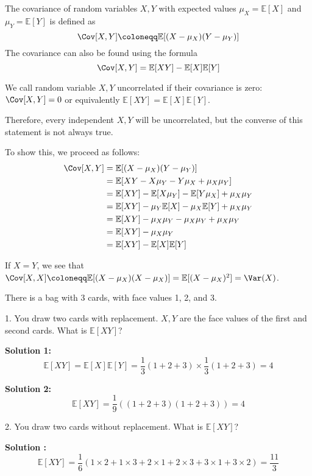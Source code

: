 \begin{definition}[Covariance]
    The covariance of random variables \(X, Y\) with expected values \(\mu_X = \mathbb{E}[X]\) and \(\mu_Y = \mathbb{E}[Y]\) is defined as 
    \[
        \Cov[X, Y] \coloneqq \mathbb{E}[(X - \mu_X)(Y - \mu_Y)]
    \]
    The covariance can also be found using the formula 
    \[
        \Cov[X, Y] = \mathbb{E}[XY] - \mathbb{E}[X]\mathbb{E}[Y]
    \]

    \begin{remark}
        We call random variable \(X, Y\) uncorrelated if their covariance is zero: \(\Cov[X, Y] = 0\) or equivalently \(\mathbb{E}[XY] = \mathbb{E}[X]\mathbb{E}[Y]\). 

        Therefore, every independent \(X, Y\) will be uncorrelated, but the converse of this statement is not always true. 
    \end{remark}
\end{definition}

To show this, we proceed as follows:
\[
    \begin{aligned}
        \Cov[X, Y] &= \mathbb{E}[(X - \mu_X)(Y - \mu_Y)] \\
        &= \mathbb{E}[XY - X\mu_Y - Y\mu_X + \mu_X\mu_Y] \\
        &= \mathbb{E}[XY] - \mathbb{E}[X\mu_Y] - \mathbb{E}[Y\mu_X] + \mu_X\mu_Y \\
        &= \mathbb{E}[XY] - \mu_Y\mathbb{E}[X] - \mu_X\mathbb{E}[Y] + \mu_X\mu_Y \\
        &= \mathbb{E}[XY] - \mu_X\mu_Y - \mu_X\mu_Y + \mu_X\mu_Y \\
        &= \mathbb{E}[XY] - \mu_X\mu_Y \\
        &= \mathbb{E}[XY] - \mathbb{E}[X]\mathbb{E}[Y]
    \end{aligned}
\]

If \(X = Y\), we see that \(\Cov[X, X] \coloneqq \mathbb{E}[(X - \mu_X)(X - \mu_X)] = \mathbb{E}[(X - \mu_X)^2] = \Var(X)\).

\begin{eg}
    There is a bag with 3 cards, with face values 1, 2, and 3.
    
    1. You draw two cards with replacement. \(X, Y\) are the face values of the first and second cards. What is \(\mathbb{E}[XY]\)?

    \textbf{Solution 1:} 
    \[
        \mathbb{E}[XY] = \mathbb{E}[X]\mathbb{E}[Y] = \dfrac{1}{3}(1 + 2 + 3) \times \dfrac{1}{3}(1 + 2 + 3) = 4
    \]

    \textbf{Solution 2:} 
    \[
        \mathbb{E}[XY] = \dfrac{1}{9}((1 + 2 + 3)(1 + 2 + 3)) = 4
    \]

    2. You draw two cards without replacement. What is \(\mathbb{E}[XY]\)?

    \textbf{Solution :} 
    \[
        \mathbb{E}[XY] = \dfrac{1}{6}(1 \times 2 + 1 \times 3 + 2 \times 1 + 2 \times 3 + 3 \times 1 + 3 \times 2) = \dfrac{11}{3}
    \]
\end{eg}

